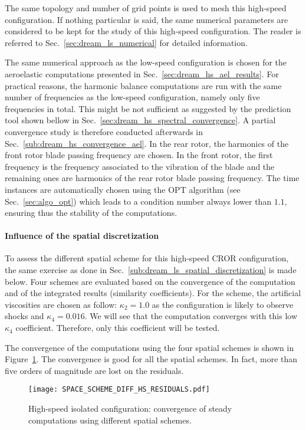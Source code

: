 
The same topology and number of grid points is used to
mesh this high-speed configuration. 
If nothing particular is said, the same numerical parameters
are considered to be kept for the study of this
high-speed configuration.
The reader is referred to 
Sec.~\ref{sec:dream_ls_numerical} for detailed information.

The same numerical approach as the low-speed configuration
is chosen for the aeroelastic computations presented in
Sec.~\ref{sec:dream_hs_ael_results}.
For practical reasons, the harmonic balance computations are run with
the same number of frequencies as the low-speed configuration,
namely only five frequencies in total. This might be not sufficient
as suggested by the prediction tool shown bellow in 
Sec.~\ref{sec:dream_hs_spectral_convergence}. A partial 
convergence study is therefore conducted afterwards 
in Sec.~\ref{sub:dream_hs_convergence_ael}.
In the rear rotor,
the harmonics of the front rotor blade passing frequency
are chosen. In the front rotor, the first frequency is the
frequency associated to the vibration of the blade and the
remaining ones are harmonics of the rear rotor blade 
passing frequency. 
The time instances are automatically chosen using the OPT
algorithm (see Sec.~\ref{sec:algo_opt}) which leads to 
a condition number always lower than $1.1$, ensuring thus
the stability of the computations.

\paragraph{Influence of the spatial discretization}
\label{sub:dream_hs_spatial_discretization}

To assess the different spatial scheme for this high-speed
CROR configuration, the same exercise as done in 
Sec.~\ref{sub:dream_ls_spatial_discretization} is made below.
Four schemes are evaluated based 
on the convergence of the computation
and of the integrated 
results (similarity coefficients).
For the \citet{Jameson1981} scheme, the artificial viscosities
are chosen as follow: $\kappa_2 = 1.0$ as the configuration is likely to 
observe shocks and $\kappa_4 = 0.016$. We will see that the computation converges
with this low $\kappa_4$ coefficient. Therefore, only this coefficient
will be tested.

The convergence of the computations using the four spatial schemes
is shown in Figure~\ref{fig:DREAM_HS_RESIDUALS_PPT}. The convergence is good
for all the spatial schemes. In fact, more than five orders of magnitude
are lost on the residuals.
\begin{figure}[htp]
  \centering
  \texttt{[image: SPACE\_SCHEME\_DIFF\_HS\_RESIDUALS.pdf]}
  \caption{High-speed isolated configuration: convergence 
  of steady computations using different spatial schemes.}
  \label{fig:DREAM_HS_RESIDUALS_PPT}
\end{figure}

